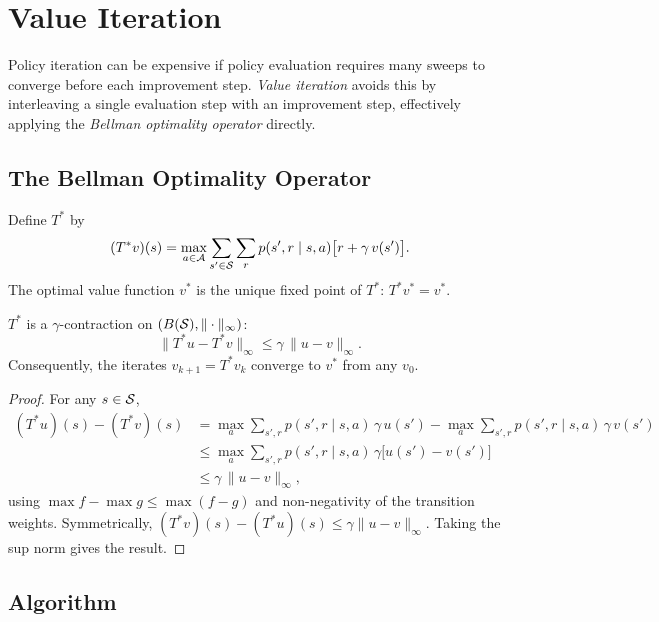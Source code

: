 \section{Value Iteration}
\label{sec:value-iteration}

Policy iteration can be expensive if policy evaluation requires many sweeps to converge before each improvement step.  \emph{Value iteration} avoids this by interleaving a single evaluation step with an improvement step, effectively applying the \emph{Bellman optimality operator} directly.

\subsection*{The Bellman Optimality Operator}

Define $T^*$ by
\begin{equation}
\label{eq:bellman-optimality-op}
(T^* v)(s) = \max_{a \in \mathcal{A}} \sum_{s' \in \mathcal{S}}\sum_r p(s',r \mid s,a)\bigl[r + \gamma\, v(s')\bigr].
\end{equation}
The optimal value function $v^*$ is the unique fixed point of $T^*$: $T^* v^* = v^*$.

\begin{theorem}[Contraction of $T^*$]
\label{thm:tstar-contraction}
$T^*$ is a $\gamma$-contraction on $(B(\mathcal{S}), \|\cdot\|_\infty)$:
\[
\|T^* u - T^* v\|_\infty \le \gamma\,\|u - v\|_\infty.
\]
Consequently, the iterates $v_{k+1} = T^* v_k$ converge to $v^*$ from any $v_0$.
\end{theorem}

\begin{proof}
For any $s \in \mathcal{S}$,
\begin{align*}
(T^* u)(s) - (T^* v)(s)
&= \max_a \sum_{s',r} p(s',r\mid s,a)\,\gamma\, u(s')
- \max_a \sum_{s',r} p(s',r\mid s,a)\,\gamma\, v(s') \\
&\le \max_a \sum_{s',r} p(s',r\mid s,a)\,\gamma\bigl[u(s') - v(s')\bigr] \\
&\le \gamma\,\|u - v\|_\infty,
\end{align*}
using $\max f - \max g \le \max(f - g)$ and non-negativity of the transition weights.  Symmetrically, $(T^* v)(s) - (T^* u)(s) \le \gamma\|u-v\|_\infty$.  Taking the sup norm gives the result.
\end{proof}

\subsection*{Algorithm}

